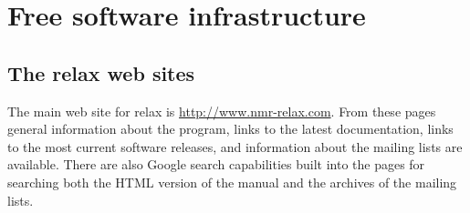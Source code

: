 


\chapter{Free software infrastructure} \label{ch: free software}




\section{The relax web sites}

The main web site for relax is \href{http://www.nmr-relax.com}{http://www.nmr-relax.com}.
From these pages general information about the program, links to the latest documentation, links to the most current software releases, and information about the mailing lists are available.
There are also Google search capabilities built into the pages for searching both the HTML version of the manual and the archives of the mailing lists.

